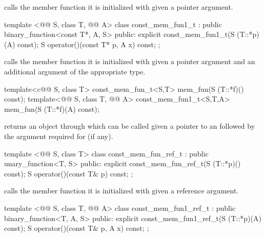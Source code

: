 \documentclass[american,twoside]{book}
\begin{document}
\begin{itemdescr}
\pnum
{} calls the member function it is initialized with
given a pointer argument.
\end{itemdescr}

%
\begin{itemdecl}
template <@@ S, class T, @@ A> class const_mem_fun1_t
      : public binary_function<const T*, A, S> {
public:
  explicit const_mem_fun1_t(S (T::*p)(A) const);
  S operator()(const T* p, A x) const;
};
\end{itemdecl}

\begin{itemdescr}
\pnum
{} calls the member function it is initialized with
given a pointer argument and an additional argument of the appropriate type.
\end{itemdescr}

%
\begin{itemdecl}
template<c@@ S, class T> const_mem_fun_t<S,T>
   mem_fun(S (T::*f)() const);
template<@@ S, class T, @@ A> const_mem_fun1_t<S,T,A>
   mem_fun(S (T::*f)(A) const);
\end{itemdecl}

\begin{itemdescr}
\pnum
{} returns an object through which  can be
called given a pointer to an  followed by the argument required for
 (if any).
\end{itemdescr}

%
\begin{itemdecl}
template <@@ S, class T> class const_mem_fun_ref_t
      : public unary_function<T, S> {
public:
  explicit const_mem_fun_ref_t(S (T::*p)() const);
  S operator()(const T& p) const;
};
\end{itemdecl}

\begin{itemdescr}
\pnum
{} calls the member function it is initialized with
given a reference argument.
\end{itemdescr}

%
\begin{itemdecl}
template <@@ S, class T, @@ A> class const_mem_fun1_ref_t
      : public binary_function<T, A, S> {
public:
  explicit const_mem_fun1_ref_t(S (T::*p)(A) const);
  S operator()(const T& p, A x) const;
};
\end{itemdecl}
\end{document}
